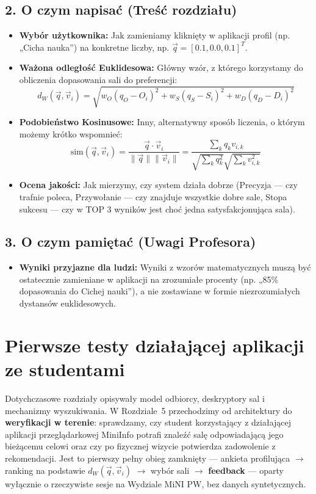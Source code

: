\documentclass[14pt,a4paper]{extarticle}
\begin{document}
\subsection*{2. O czym napisać (Treść rozdziału)}
\begin{itemize}
    \item \textbf{Wybór użytkownika:} Jak zamieniamy kliknięty w aplikacji profil (np. „Cicha nauka”) na konkretne liczby, np. $\vec{q} = [0.1, 0.0, 0.1]^T$.
    \item \textbf{Ważona odległość Euklidesowa:} Główny wzór, z którego korzystamy do obliczenia dopasowania sali do preferencji:
    \begin{equation}
    d_W(\vec{q}, \vec{v}_i) = \sqrt{w_O(q_O - O_i)^2 + w_S(q_S - S_i)^2 + w_D(q_D - D_i)^2}
    \end{equation}
    \item \textbf{Podobieństwo Kosinusowe:} Inny, alternatywny sposób liczenia, o którym możemy krótko wspomnieć:
    \begin{equation}
    \text{sim}(\vec{q}, \vec{v}_i) = \frac{\vec{q} \cdot \vec{v}_i}{\|\vec{q}\| \|\vec{v}_i\|} = \frac{\sum_{k} q_k v_{i,k}}{\sqrt{\sum_{k} q_k^2} \sqrt{\sum_{k} v_{i,k}^2}}
    \end{equation}
    \item \textbf{Ocena jakości:} Jak mierzymy, czy system działa dobrze (Precyzja --- czy trafnie poleca, Przywołanie --- czy znajduje wszystkie dobre sale, Stopa sukcesu --- czy w TOP 3 wyników jest choć jedna satysfakcjonująca sala).
\end{itemize}

\subsection*{3. O czym pamiętać (Uwagi Profesora)}
\begin{itemize}
    \item \textbf{Wyniki przyjazne dla ludzi:} Wyniki z wzorów matematycznych muszą być ostatecznie zamieniane w aplikacji na zrozumiałe procenty (np. „85\% dopasowania do Cichej nauki”), a nie zostawiane w formie niezrozumiałych dystansów euklidesowych.
\end{itemize}

\section{Pierwsze testy działającej aplikacji ze studentami}

Dotychczasowe rozdziały opisywały model odbiorcy, deskryptory sal i mechanizmy wyszukiwania. W Rozdziale~5 przechodzimy od architektury do \textbf{weryfikacji w terenie}: sprawdzamy, czy student korzystający z działającej aplikacji przeglądarkowej MiniInfo potrafi znaleźć salę odpowiadającą jego bieżącemu celowi oraz czy po fizycznej wizycie potwierdza zadowolenie z rekomendacji. Jest to pierwszy pełny obieg zamknięty --- ankieta profilująca $\rightarrow$ ranking na podstawie $d_W(\vec{q}, \vec{v}_i)$ $\rightarrow$ wybór sali $\rightarrow$ \textbf{feedback} --- oparty wyłącznie o rzeczywiste sesje na Wydziale MiNI PW, bez danych syntetycznych.
\end{document}
